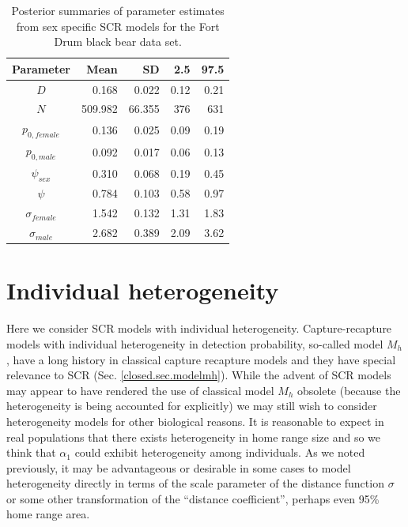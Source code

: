 \begin{table}[ht]
\centering
\caption{Posterior summaries of parameter estimates from sex specific SCR models for the Fort Drum black bear data set.}
\begin{tabular}{crrrr}
\hline \hline
Parameter & Mean & SD & 2.5 & 97.5 \\
\hline
$D$  &     0.168 & 0.022 & 0.12 & 0.21  \\
$N$   &   509.982 & 66.355 & 376 & 631 \\
$p_{0, female}$ & 0.136 & 0.025 & 0.09 & 0.19 \\
$p_{0, male}$ & 0.092 & 0.017 & 0.06 & 0.13 \\
$\psi_{sex}$ &  0.310 & 0.068 & 0.19 & 0.45 \\
$\psi$  & 0.784 & 0.103 & 0.58 & 0.97 \\
$\sigma_{female}$ & 1.542 &  0.132 & 1.31 & 1.83 \\
$\sigma_{male}$ & 2.682 & 0.389 & 2.09 & 3.62 \\ \hline
\end{tabular}
\label{covariates.tab.SCRsex}
\end{table}



\section{Individual heterogeneity}

Here we consider SCR models with individual heterogeneity.
Capture-recapture models with individual
heterogeneity in detection probability, so-called model $M_{h}$, have
a long history in classical capture recapture models and they have
special relevance to SCR (Sec. \ref{closed.sec.modelmh}). 
While the advent of SCR models may appear to have rendered the use of
classical model $M_h$ obsolete (because the heterogeneity is being
accounted for explicitly) we may still wish to consider
heterogeneity models for other biological reasons.
It is reasonable
to expect in real populations that there exists
heterogeneity in home range size and so we think that $\alpha_{1}$
could exhibit heterogeneity among individuals.  As we noted
previously, it may be advantageous or desirable in some cases to model
heterogeneity directly in terms of the scale parameter of the distance
function $\sigma$ or
some other transformation of the ``distance coefficient'', perhaps
even 95\% home range area.

